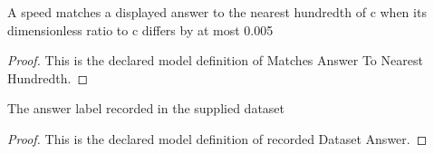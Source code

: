 \begin{definition}
  \label{def:physics:phyx-mini-0594:phyxminiproblems-problemphyxmini0594-matchesanswertonearesthundredth}
  A speed matches a displayed answer to the nearest hundredth of c when its dimensionless ratio to c differs by at most 0.005
\end{definition}
\begin{proof}
  This is the declared model definition of Matches Answer To Nearest Hundredth.
\end{proof}
\begin{definition}
  \label{def:physics:phyx-mini-0594:phyxminiproblems-problemphyxmini0594-recordeddatasetanswer}
  The answer label recorded in the supplied dataset
\end{definition}
\begin{proof}
  This is the declared model definition of recorded Dataset Answer.
\end{proof}
